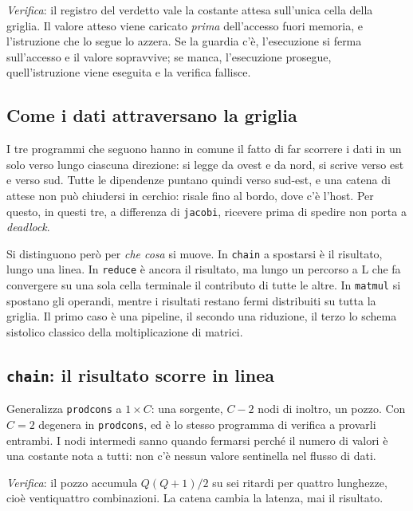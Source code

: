 \emph{Verifica}: il registro del verdetto vale la costante attesa sull'unica
cella della griglia. Il valore atteso viene caricato \emph{prima} dell'accesso fuori
memoria, e l'istruzione che lo segue lo azzera. Se la guardia c'è,
l'esecuzione si ferma sull'accesso e il valore sopravvive; se manca,
l'esecuzione prosegue, quell'istruzione viene eseguita e la verifica
fallisce.

\subsection*{Come i dati attraversano la griglia}

I tre programmi che seguono hanno in comune il fatto di far scorrere i
dati in un solo verso lungo ciascuna direzione: si legge da ovest e da nord, si scrive verso est e verso sud.
Tutte le dipendenze puntano quindi verso sud-est, e una catena di attese non può
chiudersi in cerchio: risale fino al bordo, dove c'è l'host. Per questo, in
questi tre, a differenza di \texttt{jacobi}, ricevere prima di spedire
non porta a \emph{deadlock}.

Si distinguono però per \emph{che cosa} si muove.
In \texttt{chain} a spostarsi è il risultato, lungo una linea. In
\texttt{reduce} è ancora il risultato, ma lungo un percorso a L che fa
convergere su una sola cella terminale il contributo di tutte le altre. In
\texttt{matmul} si spostano gli operandi, mentre i risultati restano fermi
distribuiti su tutta la griglia. Il primo caso è una pipeline, il secondo una
riduzione, il terzo lo schema sistolico classico della moltiplicazione di matrici.

\subsection{\texttt{chain}: il risultato scorre in linea}

Generalizza \texttt{prodcons} a $1\times C$: una sorgente, $C-2$ nodi di inoltro,
un pozzo. Con $C = 2$ degenera in \texttt{prodcons}, ed è lo stesso
programma di verifica a provarli entrambi. I nodi intermedi sanno quando
fermarsi perché il numero di valori è una costante nota a tutti: non c'è nessun
valore sentinella nel flusso di dati.

\emph{Verifica}: il pozzo accumula $Q(Q+1)/2$ su sei ritardi per quattro lunghezze,
cioè ventiquattro combinazioni. La catena cambia la latenza, mai il risultato.

